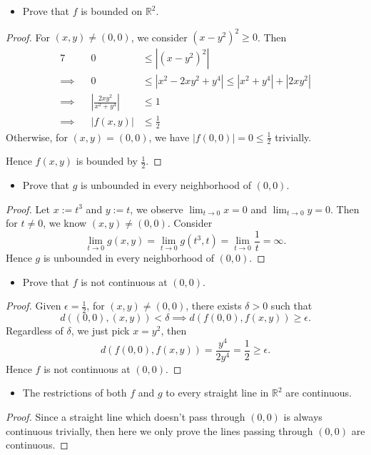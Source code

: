 \begin{Exercise}
	\begin{itemize}
		\item Prove that $f$ is bounded on $\mathbb{R}^2$.
	\end{itemize}
	\begin{proof}
		For $(x,y) \neq (0,0)$, we consider $(x-y^2)^2 \geq 0$. Then
		\begin{alignat*}{7}
		\quad&& 0 &\leq \left| (x-y^2)^2 \right| \\
		\implies&& 0 &\leq \left| x^2 - 2x y^2+ y^4 \right| \leq |x^2+y^4|+|2x y^2| \\
		\implies&& \left| \frac{2 x y^2}{x^2+y^4} \right| &\leq 1 \\
		\implies&& |f(x,y)| &\leq \frac{1}{2}
		\end{alignat*}
		Otherwise, for $(x,y)=(0,0)$, we have $|f(0,0)| = 0 \leq \frac{1}{2}$ trivially.
		
		Hence $f(x,y)$ is bounded by $\frac{1}{2}$.
	\end{proof}
	
	\begin{itemize}
		\item Prove that $g$ is unbounded in every neighborhood of $(0,0)$.
	\end{itemize}
	\begin{proof}
		Let $x := t^3$ and $y := t$, we observe $\lim_{t\to 0} x = 0$ and $\lim_{t\to 0} y = 0$. Then for $t\neq 0$, we know $(x,y) \neq (0,0)$. Consider
		$$
		\lim_{t\to 0} g(x,y) = \lim_{t\to 0} g(t^3,t) = \lim_{t\to 0}\frac{1}{t} = \infty.
		$$
		Hence $g$ is unbounded in every neighborhood of $(0,0)$.
	\end{proof}
	
	\begin{itemize}
		\item Prove that $f$ is not continuous at $(0,0)$.
	\end{itemize}
	\begin{proof}
		Given $\epsilon = \frac{1}{2}$, for $(x,y)\neq (0,0)$, there exists $\delta > 0$ such that
		$$
		d( (0,0),(x,y) ) <\delta \implies d(f(0,0),f(x,y))\geq \epsilon.
		$$
		Regardless of $\delta$, we just pick $x=y^2$, then
		$$
		d(f(0,0),f(x,y)) = \frac{y^4}{2y^4} = \frac{1}{2} \geq \epsilon.
		$$
		Hence $f$ is not continuous at $(0,0)$.
	\end{proof}
	
	\begin{itemize}
		\item The restrictions of both $f$ and $g$ to every straight line in $\mathbb{R}^2$ are continuous. 
	\end{itemize}
	\begin{proof}
		Since a straight line which doesn't pass through $(0,0)$ is always continuous trivially, then here we only prove the lines passing through $(0,0)$ are continuous.
		

\end{proof}
\end{Exercise}
